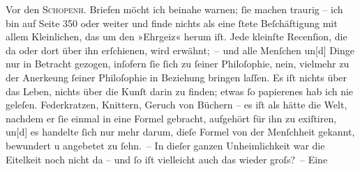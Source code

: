 \pstart
           {\pb}Vor den \textsc{Schopenh}. Briefen möcht ich beinahe warnen;{ }ſie
               machen traurig – ich bin auf Seite 350 oder weiter und finde nichts als eine{ }ſtete
               Beſchäftigung mit allem Kleinlichen, das um den »Ehrgeiz« herum iſt. Jede kleinſte
               Recenſion, die da oder dort über ihn erſchienen, wird erwähnt; – und alle Menſchen
                  un{[}d{]} Dinge nur in Betracht gezogen, inſofern{ }ſie{ }ſich zu{ }ſeiner Philoſophie, nein, vielmehr zu der Anerke{\geminationn}ung{ }ſeiner Philoſophie in Beziehung bringen laſſen. Es iſt nichts über das Leben, nichts
               über die Kunſt darin zu {\pb}finden; etwas{ }ſo papierenes hab
               ich nie geleſen. Federkratzen, Knittern, Geruch von Büchern – es iſt als hätte die
               Welt, nachdem er{ }ſie einmal in eine Formel gebracht, aufgehört für ihn zu exiſtiren,
                  un{[}d{]} es handelte{ }ſich nur mehr darum, dieſe Formel von der
               Menſchheit gekannt, bewundert u angebetet zu{ }ſehn. – In dieſer ganzen Unheimlichkeit
               war die Eitelkeit noch nicht da – und{ }ſo iſt vielleicht auch das wieder groſs? – Eine
